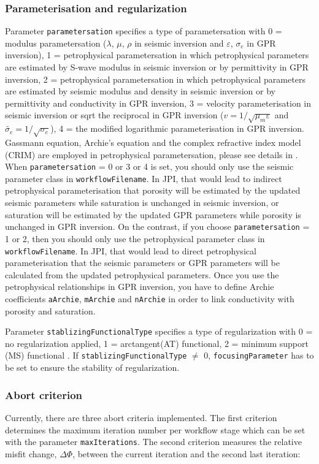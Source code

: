 \documentclass[pdftex,a4paper,parskip,listof=totoc,bibliography=totoc,onehalfspacing,12pt]{scrreprt}
\begin{document}
\subsubsection{Parameterisation and regularization}
Parameter \verb+parametersation+ specifies a type of parametersation with 0 = modulus parametersation ($\lambda$, $\mu$, $\rho$ in seismic inversion and $\varepsilon$, $\sigma_e$ in GPR inversion), 1 = petrophysical parametersation in which petrophysical parameters are estimated by S-wave modulus in seismic inversion or by permittivity in GPR inversion, 2 = petrophysical parametersation in which petrophysical parameters are estimated by seismic modulus and density in seismic inversion or by permittivity and conductivity in GPR inversion, 3 = velocity parameterisation in seismic inversion or sqrt the reciprocal in GPR inversion ($v=1/\sqrt{\mu_m \varepsilon}$ and $\widetilde{\sigma_e}=1/\sqrt{\sigma_e}$), 4 = the modified logarithmic parameterisation in GPR inversion. Gassmann equation, Archie's equation and the complex refractive index model (CRIM) are employed in petrophysical parametersation, please see details in \cite{qin2021joint}. When \verb+parametersation+ = 0 or 3 or 4 is set, you should only use the seismic parameter class in \verb+workflowFilename+. In JPI, that would lead to indirect petrophysical parameterisation  that porosity will be estimated by the updated seismic parameters while saturation is unchanged in seismic inversion, or saturation will be estimated by the updated GPR parameters while porosity is unchanged in GPR inversion. On the contrast, if you choose \verb+parametersation+ = 1 or 2, then you should only use the petrophysical parameter class in \verb+workflowFilename+. In JPI, that would lead to direct petrophysical parameterisation that the seismic parameters or GPR parameters will be calculated from the updated petrophysical parameters. Once you use the petrophysical relationships in GPR inversion, you have to define Archie coefficients \verb+aArchie+, \verb+mArchie+ and \verb+nArchie+ in order to link conductivity with porosity and saturation.

Parameter \verb+stablizingFunctionalType+ specifies a type of regularization with 0 = no regularization applied, 1 = arctangent(AT) functional, 2 = minimum support (MS) functional \citep{hu2017traveltime}. If \verb+stablizingFunctionalType+ $\neq$ 0, \verb+focusingParameter+ has to be set to ensure the stability of regularization.

\subsubsection{Abort criterion}\label{config:abort}
Currently, there are three abort criteria implemented. The first criterion determines the maximum iteration number per workflow stage which can be set with the parameter \verb+maxIterations+. The second criterion measures the relative misfit change, $\Delta \Phi$, between the current iteration and the second last iteration:
\end{document}
